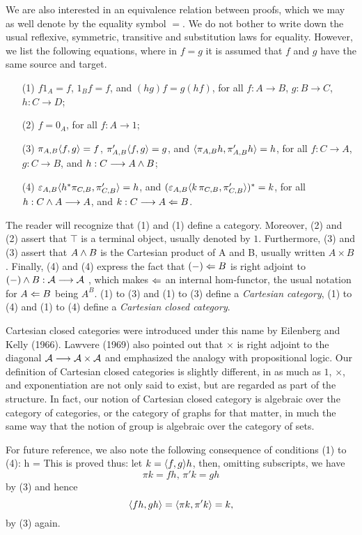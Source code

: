 We are also interested in an equivalence relation between proofs,
which we may as well denote by the equality symbol $=$. We do not bother to
write down the usual reflexive, symmetric, transitive and substitution laws for
equality. However, we list the following equations, where in $f = g$ it is
assumed that $f$ and $g$ have the same source and target.
\begin{enumerate}[align=left]
\item[(1\mprime)]$f1_A = f$, $1_Bf = f$, and $(hg)f = g(hf)$,
 for all $f:A \to B$, $g:B \to C$, $h: C\to D$;
\item[(2\mprime)] $f= 0_A$, for all $f: A \to 1$;
\item[(3\mprime)] $\pi_{A,B}\langle f,g \rangle = f$, $\pi'_{A,B}\langle f,g \rangle= g$, and
$\langle\pi_{A,B} h, \pi'_{A,B} h\rangle = h$, for all $f:C \to A$, $g:C \to B$, and $h: C\longrightarrow A\wedge B$;
\item[(4\mprime)] $\varepsilon_{A,B}\langle h^*\pi_{C,B}, \pi'_{C,B} \rangle = h$, and
$(\varepsilon_{A,B}\langle k\,\pi_{C,B}, \pi'_{C,B} \rangle)^* = k$,
for all $h: C\wedge A \longrightarrow A$, and $k: C \longrightarrow A \Leftarrow B$.
\end{enumerate}
The reader will recognize that (1) and (1\mprime) define a category.
Moreover, (2) and (2\mprime) assert that $\top$
is a terminal object, usually denoted by $1$.
Furthermore, (3) and (3\mprime) assert that $A \wedge B$ is the Cartesian product
of A and B, usually written $A \times B$.
Finally, (4) and (4\mprime) express the fact that $(-) \Leftarrow B$ is right adjoint to
$(-) \wedge B: {\cal A} \longrightarrow {\cal A}$ , which makes $\Leftarrow$ an internal hom-functor, the
usual notation for $A \Leftarrow B$ being $A^B$.
(1) to (3) and (1\mprime) to (3\mprime) define a {\it Cartesian category},
(1) to (4) and (1\mprime) to (4\mprime) define a {\it Cartesian closed category}.

Cartesian closed categories were introduced under this name
by Eilenberg and Kelly (1966). Lawvere (1969) also pointed out that $\times$
is right adjoint to the diagonal ${\cal A} \longrightarrow {\cal A} \times {\cal A}$ and emphasized the analogy
with propositional logic. Our definition of Cartesian closed categories is slightly different,
in as much as $1$, $\times$, and exponentiation are not only said to exist, but are regarded
as part of the structure. In fact, our notion of Cartesian closed category is algebraic over
the category of categories, or the category of graphs for that matter, in much the same way
that the notion of group is algebraic over the category of sets.

For future reference, we also note the following consequence of conditions (1\mprime) to (4\mprime):
\bes
{}h = 
\tag{5\mprime}
\ees
This is proved thus: let $k = \langle f,g \rangle h$, then, omitting subscripts, we have
$$
\pi k=fh, \,\pi' k=gh
$$
by (3\mprime) and hence
$$
\langle fh,gh \rangle = \langle \pi k,\pi' k \rangle = k,
$$
by (3\mprime) again.

